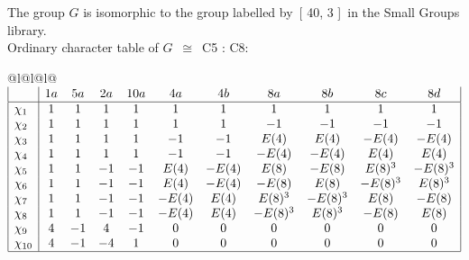 \documentclass[varwidth=\maxdimen,border=10]{standalone}
\begin{document}
The group $G$ is isomorphic to the group labelled by\ [ 40, 3 ]\ in the Small Groups library.\\
Ordinary character table of $G$\ $\cong$\ C5 : C8:\\
\begin{center}
\begin{tabular}{@{}l@{}l@{}l@{}}
\hline
\(\begin{array}{|l|cccccccccc|}
  & 1a & 5a & 2a & 10a & 4a & 4b & 8a & 8b & 8c & 8d\\ \hline
\chi_{1} & 1 & 1 & 1 & 1 & 1 & 1 & 1 & 1 & 1 & 1\\
\chi_{2} & 1 & 1 & 1 & 1 & 1 & 1 & -1 & -1 & -1 & -1\\
\chi_{3} & 1 & 1 & 1 & 1 & -1 & -1 & E(4) & E(4) & -E(4) & -E(4)\\
\chi_{4} & 1 & 1 & 1 & 1 & -1 & -1 & -E(4) & -E(4) & E(4) & E(4)\\
\chi_{5} & 1 & 1 & -1 & -1 & E(4) & -E(4) & E(8) & -E(8) & E(8)^{3} & -E(8)^{3}\\
\chi_{6} & 1 & 1 & -1 & -1 & E(4) & -E(4) & -E(8) & E(8) & -E(8)^{3} & E(8)^{3}\\
\chi_{7} & 1 & 1 & -1 & -1 & -E(4) & E(4) & E(8)^{3} & -E(8)^{3} & E(8) & -E(8)\\
\chi_{8} & 1 & 1 & -1 & -1 & -E(4) & E(4) & -E(8)^{3} & E(8)^{3} & -E(8) & E(8)\\
\chi_{9} & 4 & -1 & 4 & -1 & 0 & 0 & 0 & 0 & 0 & 0\\
\chi_{10} & 4 & -1 & -4 & 1 & 0 & 0 & 0 & 0 & 0 & 0\\
\hline
\end{array}\)\\
\end{tabular}
\end{center}
\end{document}
